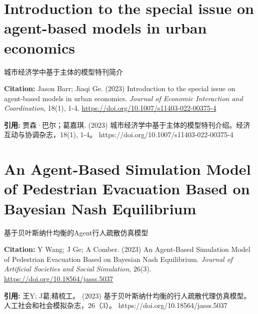 \vspace{0.5em}


\chapter{Introduction to the special issue on agent-based models in urban economics}
\begin{center}\small 城市经济学中基于主体的模型特刊简介\end{center}

\noindent\textbf{Citation:} Jason Barr; Jiaqi Ge. (2023) Introduction to the special issue on agent-based models in urban economics. \textit{Journal of Economic Interaction and Coordination}, 18(1), 1-4. \url{https://doi.org/10.1007/s11403-022-00375-4}

\vspace{0.5em}
\noindent\textbf{引用:} 贾森·巴尔；葛嘉琪. (2023) 城市经济学中基于主体的模型特刊介绍。经济互动与协调杂志，18(1), 1-4。 https://doi.org/10.1007/s11403-022-00375-4

\vspace{0.5em}


\chapter{An Agent-Based Simulation Model of Pedestrian Evacuation Based on Bayesian Nash Equilibrium}
\begin{center}\small 基于贝叶斯纳什均衡的Agent行人疏散仿真模型\end{center}

\noindent\textbf{Citation:} Y Wang; J Ge; A Comber. (2023) An Agent-Based Simulation Model of Pedestrian Evacuation Based on Bayesian Nash Equilibrium. \textit{Journal of Artificial Societies and Social Simulation}, 26(3). \url{https://doi.org/10.18564/jasss.5037}

\vspace{0.5em}
\noindent\textbf{引用:} 王Y; J葛;精梳工。 (2023) 基于贝叶斯纳什均衡的行人疏散代理仿真模型。人工社会和社会模拟杂志，26（3）。 https://doi.org/10.18564/jasss.5037

